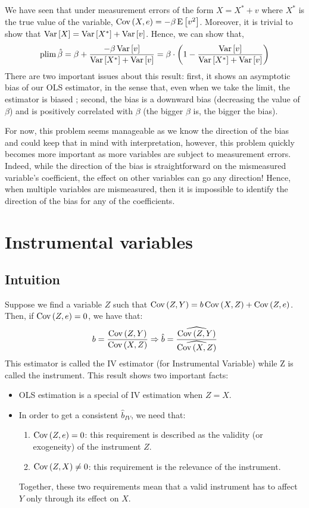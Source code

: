 We have seen that under measurement errors of the form $X = X^* + v$ where $X^*$ is the true value of the variable, $\operatorname{Cov}\left(X,e\right) = -\beta\operatorname{E}\left[v^2\right]$. Moreover, it is trivial to show that $\operatorname{Var}\left[X\right] = \operatorname{Var}\left[X^*\right] + \operatorname{Var}\left[v\right]$. Hence, we can show that, $$\operatorname{plim}\hat\beta = \beta + \frac{-\beta\operatorname{Var}\left[v\right]}{\operatorname{Var}\left[X^*\right]+\operatorname{Var}\left[v\right]} = \beta \cdot \left(1 - \frac{\operatorname{Var}\left[v\right]}{\operatorname{Var}\left[X^*\right]+\operatorname{Var}\left[v\right]}\right)$$ There are two important issues about this result: first, it shows an asymptotic bias of our OLS estimator, in the sense that, even when we take the limit, the estimator is biased ; second, the bias is a downward bias (decreasing the value of $\beta$) and is positively correlated with $\beta$ (the bigger $\beta$ is, the bigger the bias).

For now, this problem seems manageable as we know the direction of the bias and could keep that in mind with interpretation, however, this problem quickly becomes more important as more variables are subject to measurement errors. Indeed, while the direction of the bias is straightforward on the mismeasured variable's coefficient, the effect on other variables can go any direction! Hence, when multiple variables are mismeasured, then it is impossible to identify the direction of the bias for any of the coefficients.

\section{Instrumental variables}

\subsection{Intuition}

Suppose we find a variable $Z$ such that $\operatorname{Cov}\left(Z,Y\right) = b\operatorname{Cov}\left(X,Z\right) + \operatorname{Cov}\left(Z,e\right)$. Then, if $\operatorname{Cov}\left(Z,e\right)=0$, we have that: $$b = \frac{\operatorname{Cov}\left(Z,Y\right)}{\operatorname{Cov}\left(X,Z\right)} \Rightarrow \hat b = \frac{\widehat{\operatorname{Cov}\left(Z,Y\right)}}{\widehat{\operatorname{Cov}\left(X,Z\right)}} $$ This estimator is called the IV estimator (for Instrumental Variable) while Z is called the instrument. This result shows two important facts:\begin{itemize}
\item OLS estimation is a special of IV estimation when $Z = X$.
\item In order to get a consistent $\hat b_{IV}$, we need that:\begin{enumerate}
\item $\operatorname{Cov}\left(Z,e\right) = 0$: this requirement is described as the validity (or exogeneity) of the instrument $Z$.
\item $\operatorname{Cov}\left(Z,X\right) \neq 0$: this requirement is the relevance of the instrument.
\end{enumerate}
Together, these two requirements mean that a valid instrument has to affect $Y$ only through its effect on $X$.
\end{itemize}

